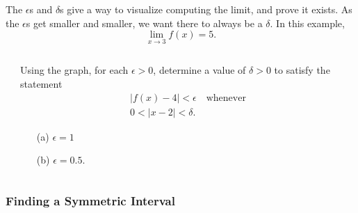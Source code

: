 \documentclass[cal1spr16Lectures.tex]{subfiles}
\begin{document}
\begin{frame}{}
The $\epsilon$s and $\delta$s give a way to visualize computing the limit, and prove it exists.  As the $\epsilon$s get smaller and smaller, we want there to always be a $\delta$.  In this example,
\[\lim_{x\to 3}f(x)=5.\]
\end{frame}

\begin{frame}\footnotesize
\begin{exe}
\vspace{0.75pc}
\begin{columns}[T]
	\begin{column}{.22\textwidth}
	\end{column}
	\begin{column}{.6\textwidth}
		Using the graph, for each $\epsilon>0$, determine a value of $\delta>0$ to satisfy the statement
		\begin{multline*}|f(x)-4|<\epsilon\quad\text{whenever} \\
			0<|x-2|<\delta.\end{multline*}  
		\vspace{-1pc}
		\begin{itemize}
		\item[(a) ] $\epsilon=1$ 
		\item[(b) ] $\epsilon=0.5$.
		\end{itemize}
	\end{column}
\end{columns}
\end{exe}
\end{frame} 

\subsubsection{Finding a Symmetric Interval}
\end{document}
